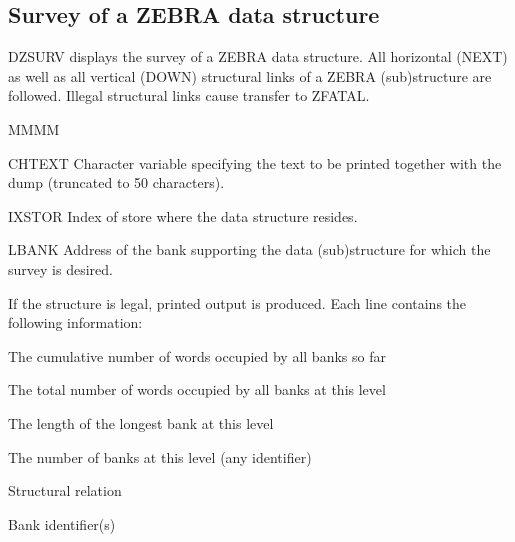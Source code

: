 \subsection{Survey of a ZEBRA data structure}
\par DZSURV displays the survey of a ZEBRA data structure.
All horizontal (NEXT) as well as all vertical (DOWN) structural
links of a ZEBRA (sub)structure are followed.
Illegal structural links cause transfer to ZFATAL.
\Idesc
\begin{DL}{MMMM}
\item[CHTEXT]Character variable specifying the text to be printed
together with the dump (truncated to 50 characters).
\item[IXSTOR]Index of store where the data structure resides.
\item[LBANK]Address of the bank supporting the data (sub)structure for which
the survey is desired.
\end{DL}
If the structure is legal, printed output is produced.
Each line contains the following information:
\begin{UL}
\item The cumulative number of words occupied by all banks so far
\item The total number of words occupied by all banks at this level
\item The length of the longest bank at this level
\item The number of banks at this level (any identifier)
\item Structural relation
\item Bank identifier(s)
\end{UL}
